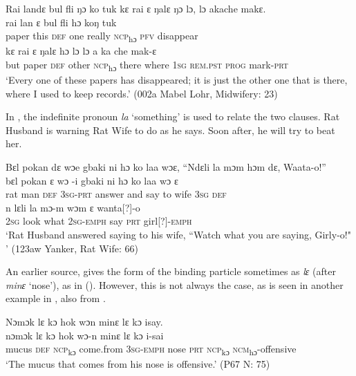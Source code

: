 \ea%
    \label{ex:238}
    Rai landɛ bul fli ŋɔ ko tuk kɛ rai ɛ ŋalɛ ŋɔ lɔ, lɔ akache makɛ.\\
    \gll rai    lan  ɛ    bul  fli    hɔ    koŋ  tuk\\
    paper  this  \textsc{def}  one  really  \textsc{ncp}\textsubscript{hɔ}  \textsc{pfv}  disappear\\
    \gll kɛ    rai      ɛ    ŋalɛ  hɔ    lɔ    lɔ     a    ka      che  mak-ɛ\\
    but  paper    \textsc{def}  other  \textsc{ncp}\textsubscript{hɔ}  there  where \textsc{1sg}  \textsc{rem.pst}  \textsc{prog}  mark-\textsc{prt}\\
    \glt ‘Every one of these papers has disappeared; it is just the other one that is there, where I used to keep records.' (002a Mabel Lohr, Midwifery: 23)
\z

In , the indefinite pronoun \textit{la} ‘something' is used to relate the two clauses. Rat Husband is warning Rat Wife to do as he says. Soon after, he will try to beat her.

\newpage
\ea%
    \label{ex:239}
    Bɛl pokan dɛ wɔe gbaki  ni hɔ ko laa wɔɛ, “Ndɛli la mɔm hɔm dɛ, Waata-o!”\\
    \gll bɛl    pokan  ɛ    wɔ  {}-i    gbaki    ni    hɔ    ko    laa    wɔ    ɛ\\
    rat    man    \textsc{def}  \textsc{3sg-prt}  answer  and  say  to    wife  \textsc{3sg}  \textsc{def}\\
    \gll n    lɛli  la    mɔ-m      wɔm  ɛ  wanta[?]-o\\
    \textsc{2sg}  look  what  \textsc{2sg-emph}  say  \textsc{prt} girl[?]\textsc{{}-emph}\\
    \glt ‘Rat Husband answered saying to his wife, “Watch what you are saying, Girly-o!" ' (123aw Yanker, Rat Wife: 66)
\z

An earlier source, gives the form of the binding particle sometimes as \textit{lɛ} (after \textit{minɛ} ‘nose'), as in  (\citealt{Pichl1967}). However, this is not always the case, as is seen in another example in , also from \citet{Pichl1967}.

\ea%
    \label{ex:240}
    \ea\label{ex:240a}  Nɔmɔk lɛ kɔ hok wɔn minɛ lɛ kɔ isay.\\
    \gll nɔmɔk  lɛ    kɔ      hok      wɔ-n      minɛ  lɛ    kɔ      i-sai\\
    mucus  \textsc{def}  \textsc{ncp}\textsubscript{kɔ}    come.from  \textsc{3sg}{}-\textsc{emph}  nose  \textsc{prt}  \textsc{ncp}\textsubscript{kɔ}    \textsc{ncm}\textsubscript{hɔ}{}-offensive\\
    \glt ‘The mucus that comes from his nose is offensive.' (P67 N: 75)

